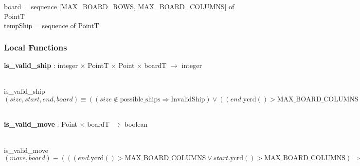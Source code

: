 \documentclass[12pt]{article}
\begin{document}
board = sequence [\mbox{MAX\_BOARD\_ROWS}, \mbox{MAX\_BOARD\_COLUMNS}] of PointT\\
tempShip = sequence of PointT\\

\subsubsection* {Local Functions}

\noindent \textbf{is\_valid\_ship} : integer $\times$ PointT $\times$ Point $\times$ boardT $\rightarrow$ integer\\

~\newline

is\_valid\_ship$(size, start, end, board) \equiv ((size \not \in \mbox{possible\_ships} \Rightarrow \mbox{InvalidShip}) \vee ((end.\mbox{ycrd}() > \mbox{MAX\_BOARD\_COLUMNS} \vee start.\mbox{ycrd}() > \mbox{MAX\_BOARD\_COLUMNS} ) \Rightarrow \mbox{OutOfBoundsException}) \vee ((end.\mbox{xcrd}() > \mbox{MAX\_BOARD\_ROWS} \vee start.\mbox{xcrd}() > \mbox{MAX\_BOARD\_ROWS})  \Rightarrow \mbox{OutOfBoundsException}) \vee ((end \in \mbox{shipList} \vee start \in \mbox{shipList})  \Rightarrow \mbox{InvalidMove}) \vee ((end.\mbox{xcrd}() \ne start.\mbox{xcrd}()) \vee (end.\mbox{ycrd}() \ne start.\mbox{ycrd}()) \Rightarrow \mbox{InvalidShip}) \vee (end.\mbox{xcrd}() = start.\mbox{xcrd}() \Rightarrow 1 | 2))$ \\

~\newline

\noindent \textbf{is\_valid\_move} : Point $\times$ boardT $\rightarrow$ boolean\\

~\newline

is\_valid\_move$(move, board) \equiv (((end.\mbox{ycrd}() > \mbox{MAX\_BOARD\_COLUMNS} \vee start.\mbox{ycrd}() > \mbox{MAX\_BOARD\_COLUMNS})  \Rightarrow \mbox{OutOfBoundsException}) \vee ((end.\mbox{xcrd}() > \mbox{MAX\_BOARD\_ROWS} \vee start.\mbox{xcrd}() > \mbox{MAX\_BOARD\_ROWS})  \Rightarrow \mbox{OutOfBoundsException}) \vee ((end \in \mbox{board} \vee start \in \mbox{board} ) \Rightarrow \mbox{InvalidMove}) \vee True)$ \\
\end{document}
